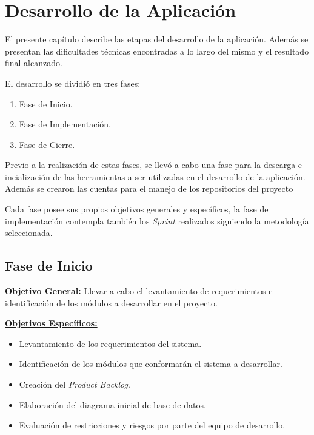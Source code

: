 \chapter{Desarrollo de la Aplicación}
\label{desarrollo-capitulo}

El presente capítulo describe las etapas del desarrollo de la aplicación. Además se presentan las dificultades técnicas encontradas a lo largo del mismo y el resultado final alcanzado.

El desarrollo se dividió en tres fases:

\begin{enumerate}
    \item Fase de Inicio.    
    \item Fase de Implementación.
    \item Fase de Cierre.
\end{enumerate}

Previo a la realización de estas fases, se llevó a cabo una fase para la descarga e incialización de las herramientas a ser utilizadas en el desarrollo de la aplicación. Además se crearon las cuentas para el manejo de  los repositorios del proyecto

Cada fase posee sus propios objetivos generales y específicos, la fase de implementación contempla también los \textit{Sprint} realizados siguiendo la metodología seleccionada.

\section{Fase de Inicio}
    
    \textbf{\underline{Objetivo General:}}
    Llevar a cabo el levantamiento de requerimientos e identificación de los módulos a desarrollar en el proyecto.
    
    \textbf{\underline{Objetivos Específicos:}}
    \begin{itemize}
        \item Levantamiento de los requerimientos del sistema.
        \item Identificación de los módulos que conformarán el sistema a desarrollar.
        \item Creación del \textit{Product Backlog}.
        \item Elaboración del diagrama inicial de base de datos. %
        \item Evaluación de restricciones y riesgos por parte del equipo de desarrollo.
    \end{itemize}
    
